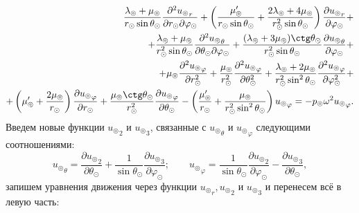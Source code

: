 \begin{equation*}
\begin{split}
\frac{\lambda_\circledcirc+\mu_\circledcirc}{r_\odot\sin\theta_\odot} \frac{\partial^2{u_\circledcirc}_r}{\partial r_\odot \partial \varphi_\odot} + \left(\frac{\mu_\circledcirc'}{r_\odot\sin\theta_\odot} + \frac{2\lambda_\circledcirc+4\mu_\circledcirc}{r_\odot^2\sin\theta_\odot} \right)\frac{\partial {u_\circledcirc}_r}{\partial \varphi_\odot} +\\
+ \frac{\lambda_\circledcirc+\mu_\circledcirc}{r_\odot^2\sin\theta_\odot}\frac{\partial^2 {u_\circledcirc}_\theta}{\partial \theta_\odot \partial \varphi_\odot} + \frac{(\lambda_\circledcirc+3\mu_\circledcirc)\ctg\theta_\odot}{r_\odot^2\sin\theta_\odot}\frac{\partial {u_\circledcirc}_\theta}{\partial \varphi_\odot} +\\
+ \mu_\circledcirc \frac{\partial^2 {u_\circledcirc}_\varphi}{\partial r_\odot^2} + \frac{\mu_\circledcirc}{r_\odot^2}\frac{\partial^2 {u_\circledcirc}_\varphi}{\partial \theta_\odot^2} + \frac{\lambda_\circledcirc+2\mu_\circledcirc}{r_\odot^2\sin^2\theta_\odot} \frac{\partial^2 {u_\circledcirc}_\varphi}{\partial \varphi_\odot^2} + \\
+ \left(\mu_\circledcirc'+\frac{2\mu_\circledcirc}{r_\odot}\right)\frac{\partial {u_\circledcirc}_\varphi}{\partial r_\odot} + \frac{\mu_\circledcirc\ctg\theta_\odot}{r_\odot^2}\frac{\partial {u_\circledcirc}_\varphi}{\partial \theta_\odot} - \left(\frac{\mu_\circledcirc'}{r_\odot} + \frac{\mu_\circledcirc}{r_\odot^2\sin^2\theta_\odot}\right){u_\circledcirc}_\varphi = - p_\circledcirc\omega^2{u_\circledcirc}_\varphi.
\end{split}
\end{equation*}
Введем новые функции ${u_\circledcirc}_2$ и ${u_\circledcirc}_3$, связанные с ${u_\circledcirc}_\theta$ и ${u_\circledcirc}_\varphi$ следующими соотношениями:
\begin{equation}\label{eq_v2v3}
{u_\circledcirc}_\theta = \dfrac{\partial {u_\circledcirc}_2}{\partial\theta_\odot} + \frac1{\sin\theta_\odot}\frac{\partial {u_\circledcirc}_3}{\partial\varphi_\odot}; \qquad {u_\circledcirc}_\varphi = \dfrac1{\sin\theta_\odot}\dfrac{\partial {u_\circledcirc}_2}{\partial\varphi_\odot} - \dfrac{\partial {u_\circledcirc}_3}{\partial\theta_\odot},
\end{equation}
запишем уравнения движения через функции ${u_\circledcirc}_r, {u_\circledcirc}_2$ и ${u_\circledcirc}_3$ и перенесем всё в левую часть:

